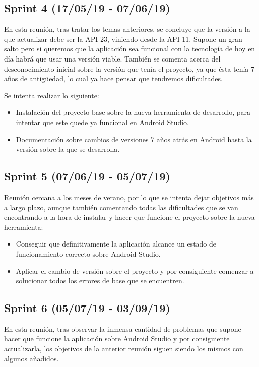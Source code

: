 \subsection{Sprint 4 (17/05/19 - 07/06/19)}

En esta reunión, tras tratar los temas anteriores, se concluye que la versión a la que actualizar debe ser la API 23, viniendo desde la API 11. Supone un gran salto pero si queremos que la aplicación sea funcional con la tecnología de hoy en día habrá que usar una versión viable. También se comenta acerca del desconocimiento inicial sobre la versión que tenía el proyecto, ya que ésta tenía 7 años de antigüedad, lo cual ya hace pensar que tendremos dificultades.

Se intenta realizar lo siguiente:

\begin{itemize}
\item Instalación del proyecto base sobre la nueva herramienta de desarrollo, para intentar que este quede ya funcional en Android Studio.
\item Documentación sobre cambios de versiones 7 años atrás en Android hasta la versión sobre la que se desarrolla.
\end{itemize}

\subsection{Sprint 5 (07/06/19 - 05/07/19)}

Reunión cercana a los meses de verano, por lo que se intenta dejar objetivos más a largo plazo, aunque también comentando todas las dificultades que se van encontrando a la hora de instalar y hacer que funcione el proyecto sobre la nueva herramienta:

\begin{itemize}
\item Conseguir que definitivamente la aplicación alcance un estado de funcionamiento correcto sobre Android Studio.
\item Aplicar el cambio de versión sobre el proyecto y por consiguiente comenzar a solucionar todos los errores de base que se encuentren.
\end{itemize}

\subsection{Sprint 6 (05/07/19 - 03/09/19)}

En esta reunión, tras observar la inmensa cantidad de problemas que supone hacer que funcione la aplicación sobre Android Studio y por consiguiente actualizarla, los objetivos de la anterior reunión siguen siendo los mismos con algunos añadidos.

